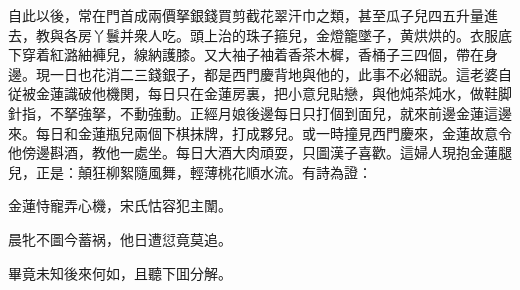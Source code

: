 自此以後，常在門首成兩價拏銀錢買剪截花翠汗巾之類，甚至瓜子兒四五升量進去，教與各房丫鬟并衆人吃。頭上治的珠子箍兒，金燈籠墜子，黄烘烘的。衣服底下穿着紅潞紬褲兒，線納護膝。又大袖子袖着香茶木樨，香桶子三四個，帶在身邊。現一日也花消二三錢銀子，都是西門慶背地與他的，此事不必細説。這老婆自従被金蓮識破他機関，每日只在金蓮房裏，把小意兒貼戀，與他炖茶炖水，做鞋脚針指，不拏強拏，不動強動。正經月娘後邊每日只打個到面兒，就來前邊金蓮這邊來。每日和金蓮瓶兒兩個下棋抹牌，打成夥兒。或一時撞見西門慶來，金蓮故意令他傍邊斟酒，教他一處坐。每日大酒大肉頑耍，只圖漢子喜歡。這婦人現抱金蓮腿兒，正是：顛狂柳絮隨風舞，輕薄桃花順水流。有詩為證：

\begin{myquote}
金蓮恃寵弄心機，宋氏怙容犯主闈。

晨牝不圖今蓄祸，他日遭愆竟莫追。
\end{myquote}

畢竟未知後來何如，且聽下囬分解。

